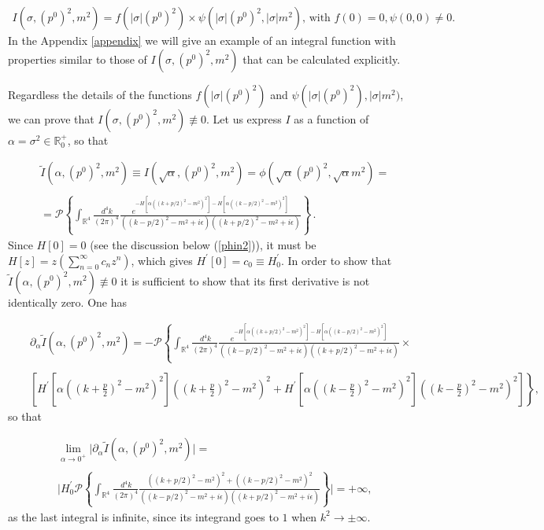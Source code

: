 \documentclass[a4paper,11pt]{article}
\newcommand{\be}{\begin{eqnarray}}
\newcommand{\ee}{\end{eqnarray}}
\begin{document}
\be
I(\sigma, (p^0)^2,m^2) =  f(|\sigma| (p^0)^2) \times \psi(|\sigma| (p^0)^2, |\sigma| m^2), \, \text{with }  f(0)=0, \psi(0,0)\neq 0 .
\ee
In the Appendix \ref{appendix} we will give an example of an integral function with properties similar to those of $I(\sigma, (p^0)^2,m^2)$ that can be calculated explicitly.


Regardless the details of the functions $f(|\sigma| (p^0)^2) $ and $\psi(|\sigma| (p^0)^2),|\sigma|m^2)$, we can prove that $I(\sigma,(p^0)^2,m^2)\not\equiv 0$. Let us express $I$ as a function of $\alpha = \sigma^2 \in \mathbb{R}^+_0$, so that


\be\label{definition I 3}
&&\tilde{I}(\alpha,(p^0)^2,m^2) \equiv I(\sqrt{\alpha},(p^0)^2,m^2)= \phi\left(\sqrt{\alpha}(p^0)^2,\sqrt{\alpha}m^2\right)=\\ \nonumber
\\\nonumber
&&= \mathcal{P}\left\{\int_{ \mathbb{R}^4} \frac{ \, d^4 k}{(2\pi)^4}
\frac{e^{-H\left[\alpha \left(\left(k+p/2\right)^2-m^2\right)^2\right]-H\left[\alpha\left(\left(k-p/2\right)^2-m^2\right)^2\right]}}{\left((k-p/2)^2 - m^2 + i \epsilon\right) \left((k+p/2)^2 - m^2 + i \epsilon\right)}\right\} \, .
\ee
Since $H[0]=0$ (see the discussion below (\ref{phin2})), it must be $H[z]= z \left(\sum_{n=0}^{\infty}c_n z^n\right)$, which gives $H^\prime[0]= c_0 \equiv H^\prime_0$. In order to show that $\tilde{I}(\alpha,(p^0)^2,m^2)\not\equiv 0$ it is sufficient to show that its first derivative is not identically zero. One has

\be\label{definition I 4}
&&\partial_\alpha \tilde{I}(\alpha,(p^0)^2,m^2)= - \mathcal{P}\left\{\int_{ \mathbb{R}^4} \frac{ \, d^4 k}{(2\pi)^4}
\frac{e^{-H\left[\alpha\left(\left(k+p/2\right)^2-m^2\right)^2\right]-H\left[\alpha\left(\left(k-p/2\right)^2-m^2\right)^2\right]}}{\left((k-p/2)^2 - m^2 + i \epsilon\right) \left((k+p/2)^2 - m^2 + i \epsilon\right)}\right. \times\\ \nonumber
\\\nonumber
&& \left.\left[H^\prime\left[\alpha\left(\left(k+\frac{p}{2}\right)^2-m^2\right)^2\right]\left(\left(k+\frac{p}{2}\right)^2-m^2\right)^2+H^\prime\left[\alpha\left(\left(k-\frac{p}{2}\right)^2-m^2\right)^2\right]\left(\left(k-\frac{p}{2}\right)^2-m^2\right)^2\right]  \right\},
\ee
so that

\be\label{definition I 10}
&&\lim\limits_{\alpha\rightarrow0^+}\vert \partial_\alpha \tilde{I}(\alpha,(p^0)^2,m^2) \vert= \\
\nonumber
\\
&&\nonumber \Bigg| H^\prime_0 \mathcal{P}\left\{\int_{ \mathbb{R}^4} \frac{ \, d^4 k}{(2\pi)^4}
\frac{\left(\left(k+p/2\right)^2-m^2\right)^2+\left(\left(k-p/2\right)^2-m^2\right)^2}{\left((k-p/2)^2 - m^2 + i \epsilon\right) \left((k+p/2)^2 - m^2 + i \epsilon\right)}\right\} \Bigg| = + \infty,
\ee
as the last integral is infinite, since its integrand goes to $1$ when $k^2 \rightarrow \pm \infty$. 
\end{document}

